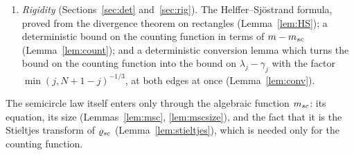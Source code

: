 \begin{enumerate}[leftmargin=2em,itemsep=2pt]
are excluded by the averaged law outside the spectrum.
\item \emph{Rigidity} (Sections~\ref{sec:det} and~\ref{sec:rig}). The Helffer--Sj\"ostrand formula, proved from the divergence theorem on rectangles (Lemma~\ref{lem:HS}); a deterministic
bound on the counting function in terms of $m-m_{sc}$ (Lemma~\ref{lem:count}); and a deterministic conversion lemma which turns the bound on the counting function
into the bound on $\lambda_j-\gamma_j$ with the factor $\min(j,N+1-j)^{-1/3}$, at both edges at once (Lemma~\ref{lem:conv}).
\end{enumerate}
The semicircle law itself enters only through the algebraic function $m_{sc}$: its equation, its size (Lemmas~\ref{lem:msc}, \ref{lem:mscsize}), and the fact that it is the
Stieltjes transform of $\varrho_{sc}$ (Lemma~\ref{lem:stieltjes}), which is needed only for the counting function.

